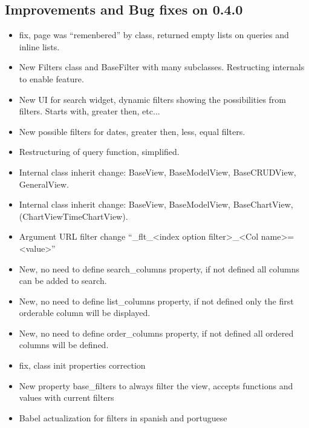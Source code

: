 \documentclass[letterpaper,10pt,english]{sphinxmanual}
\begin{document}
\subsection{Improvements and Bug fixes on 0.4.0}
\label{versions:improvements-and-bug-fixes-on-0-4-0}\begin{itemize}
\item {} 
fix, page was ``remenbered'' by class, returned empty lists on queries and inline lists.

\item {} 
New Filters class and BaseFilter with many subclasses. Restructing internals to enable feature.

\item {} 
New UI for search widget, dynamic filters showing the possibilities from filters. Starts with, greater then, etc...

\item {} 
New possible filters for dates, greater then, less, equal filters.

\item {} 
Restructuring of query function, simplified.

\item {} 
Internal class inherit change: BaseView, BaseModelView, BaseCRUDView, GeneralView.

\item {} 
Internal class inherit change: BaseView, BaseModelView, BaseChartView, (ChartView\textbar{}TimeChartView).

\item {} 
Argument URL filter change ``\_flt\_\textless{}index option filter\textgreater{}\_\textless{}Col name\textgreater{}=\textless{}value\textgreater{}''

\item {} 
New, no need to define search\_columns property, if not defined all columns can be added to search.

\item {} 
New, no need to define list\_columns property, if not defined only the first orderable column will be displayed.

\item {} 
New, no need to define order\_columns property, if not defined all ordered columns will be defined.

\item {} 
fix, class init properties correction

\item {} 
New property base\_filters to always filter the view, accepts functions and values with current filters

\item {} 
Babel actualization for filters in spanish and portuguese

\end{itemize}
\end{document}
